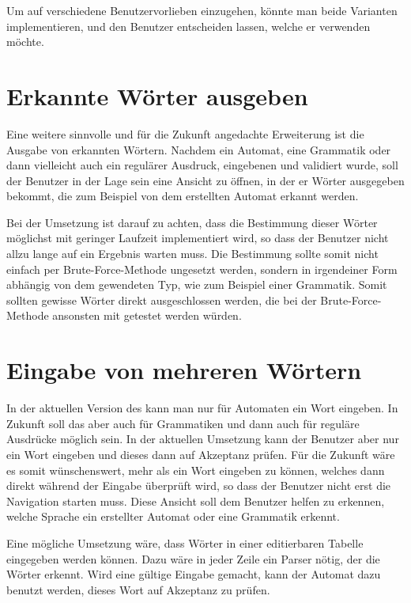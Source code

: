 Um auf verschiedene Benutzervorlieben einzugehen, könnte man beide Varianten
implementieren, und den Benutzer entscheiden lassen, welche er verwenden
möchte.\vspace{10pt}

\section{Erkannte Wörter ausgeben}

Eine weitere sinnvolle und für die Zukunft angedachte Erweiterung ist die
Ausgabe von erkannten Wörtern. Nachdem ein Automat, eine Grammatik oder dann
vielleicht auch ein regulärer Ausdruck, eingebenen und validiert wurde, soll der
Benutzer in der Lage sein eine Ansicht zu öffnen, in der er Wörter ausgegeben
bekommt, die zum Beispiel von dem erstellten Automat erkannt
werden.\vspace{10pt}

Bei der Umsetzung ist darauf zu achten, dass die Bestimmung dieser Wörter
möglichst mit geringer Laufzeit implementiert wird, so dass der Benutzer nicht
allzu lange auf ein Ergebnis warten muss. Die Bestimmung sollte somit nicht
einfach per Brute-Force-Methode ungesetzt werden, sondern in irgendeiner Form
abhängig von dem gewendeten Typ, wie zum Beispiel einer Grammatik. Somit sollten
gewisse Wörter direkt ausgeschlossen werden, die bei der Brute-Force-Methode
ansonsten mit getestet werden würden.\vspace{10pt}


\section{Eingabe von mehreren Wörtern}

In der aktuellen Version des \gtitools kann man nur für Automaten ein Wort
eingeben. In Zukunft soll das aber auch für Grammatiken und dann auch für
reguläre Ausdrücke möglich sein. In der aktuellen Umsetzung kann der Benutzer
aber nur ein Wort eingeben und dieses dann auf Akzeptanz prüfen. Für die
Zukunft wäre es somit wünschenswert, mehr als ein Wort eingeben zu können,
welches dann direkt während der Eingabe überprüft wird, so dass der Benutzer
nicht erst die Navigation starten muss. Diese Ansicht soll dem Benutzer helfen
zu erkennen, welche Sprache ein erstellter Automat oder eine Grammatik
erkennt.\vspace{10pt}

Eine mögliche Umsetzung wäre, dass Wörter in einer editierbaren Tabelle
eingegeben werden können. Dazu wäre in jeder Zeile ein Parser nötig, der die
Wörter erkennt. Wird eine gültige Eingabe gemacht, kann der Automat dazu
benutzt werden, dieses Wort auf Akzeptanz zu prüfen.\vspace{10pt}



